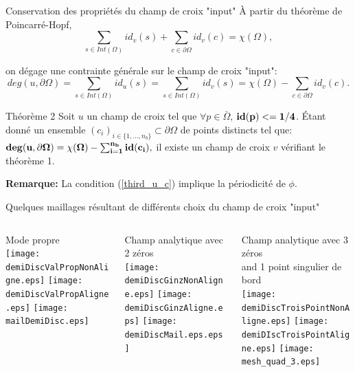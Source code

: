 \begin{frame}{Conservation des propriétés du champ de croix "input"}
\vspace{-0.2cm}
\small
À partir du théorème de Poincarré-Hopf,
\begin{equation*}
\sum_{s\in Int(\Omega)} id_v(s)+\sum_{c\in \partial\Omega} id_v(c) = \chi(\Omega),
\label{poincareformula_3}
\end{equation*}

on dégage une contrainte générale sur le champ de croix "input":
\begin{equation}
deg(u, \partial\Omega) =\sum_{s\in Int(\Omega)} id_u(s) = \sum_{s\in Int(\Omega)} id_v(s) = \chi(\Omega)-\sum_{c\in \partial \Omega} id_v(c).
\label{third_u_c}
\end{equation}
\begin{onerablock}{Théorème 2}
Soit $u$ un champ de croix tel que $\forall p\in\bar{\Omega}$, ${\bf id(p)<=1/4}$. \'Etant donné un ensemble $(c_i)_{i\in\{1,\dots,n_b\}}\subset\partial\Omega$ de points distincts tel que:
$
{\bf deg(u, \partial\Omega) = \chi(\Omega)-\sum_{i=1}^{n_b} id(c_i),}
$
il existe un champ de croix $v$ vérifiant le théorème 1.
\end{onerablock}
\vspace{0.1cm}
{\bf Remarque:}
La condition (\ref{third_u_c}) implique la périodicité de $\phi$.
\end{frame}


\begin{frame}{\fontsize{12}{12}\selectfont Quelques maillages résultant de différents choix du champ de croix "input"}
\vspace{-0.28cm}
\begin{columns}
\begin{column}{0.4\textwidth}
    \centering
    \scriptsize Mode propre\\
    \texttt{[image: demiDiscValPropNonAligne.eps]}
    \texttt{[image: demiDiscValPropAligne.eps]}
    \texttt{[image: mailDemiDisc.eps]}
\end{column}
\begin{column}{0.4\textwidth}
    \centering
    \scriptsize Champ analytique avec 2 zéros\\
    \texttt{[image: demiDiscGinzNonAligne.eps]}
    \texttt{[image: demiDiscGinzAligne.eps]}
    \texttt{[image: demiDiscMail.eps.eps]}
\end{column}
\begin{column}{0.4\textwidth}
    \centering
    \scriptsize Champ analytique avec 3 zéros\\ and 1 point singulier de bord\\
    \texttt{[image: demiDiscTroisPointNonAligne.eps]}
    \texttt{[image: demiDIscTroisPointAligne.eps]}
    \texttt{[image: mesh\_quad\_3.eps]}
\end{column}
\end{columns}
\end{frame}

